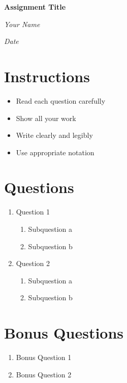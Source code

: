 \documentclass[12pt]{article}
\newcommand{\question}[1]{\item #1}
\newcommand{\subquestion}[1]{\item #1}
\begin{document}
\begin{center}
    \Large\textbf{Assignment Title}
    
    \vspace{0.5em}
    \normalsize\textit{Your Name}
    
    \vspace{0.5em}
    \normalsize\textit{Date}
\end{center}

\section*{Instructions}
\begin{itemize}
    \item Read each question carefully
    \item Show all your work
    \item Write clearly and legibly
    \item Use appropriate notation
\end{itemize}

\section*{Questions}
\begin{enumerate}
    \question{Question 1}
    \begin{enumerate}
        \subquestion{Subquestion a}
        \subquestion{Subquestion b}
    \end{enumerate}
    
    \question{Question 2}
    \begin{enumerate}
        \subquestion{Subquestion a}
        \subquestion{Subquestion b}
    \end{enumerate}
\end{enumerate}

\section*{Bonus Questions}
\begin{enumerate}
    \question{Bonus Question 1}
    \question{Bonus Question 2}
\end{enumerate}
\end{document}
